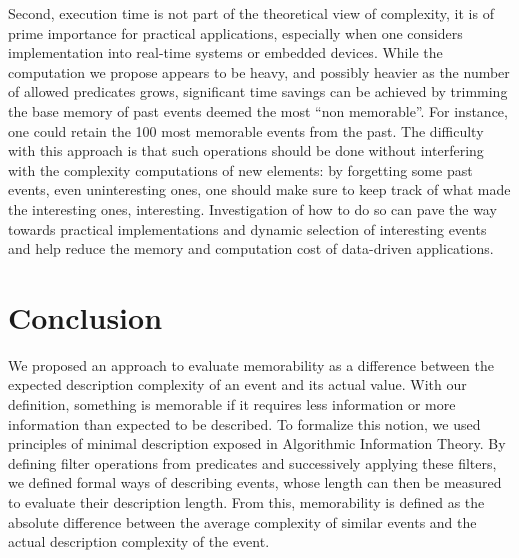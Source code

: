 \documentclass[entropy,article,submit,moreauthors,pdftex]{Definitions/mdpi}
\begin{document}
Second, execution time is not part of the theoretical view of complexity, it
is of prime importance for practical applications, especially when one considers
implementation into real-time systems or embedded devices. While the computation
we propose appears to be heavy, and possibly heavier as the number of allowed
predicates grows, significant time savings can be achieved by trimming the base
memory of past events deemed the most ``non memorable''. For instance, one could retain
the 100 most memorable events from the past. The difficulty with
this approach is that such operations should be done without interfering with the complexity computations of new elements: by forgetting some
past events, even uninteresting ones, one should make sure to keep track of what
made the interesting ones, interesting. Investigation of how to do so can pave
the way towards practical implementations and dynamic selection of interesting
events and help reduce the memory and computation cost of data-driven applications.


\section{Conclusion}

We proposed an approach to evaluate memorability as a difference between the expected description complexity of an event and its actual value. With our definition, something is memorable if it requires less information or more information than expected to be described. To formalize this notion, we used principles of minimal description exposed in Algorithmic Information Theory. By defining filter operations from predicates and successively applying these filters, we defined formal ways of describing events, whose length can then be measured to evaluate their description length. From this, memorability is defined as the absolute difference between the average complexity of similar events and the actual description complexity of the event.


\end{document}
